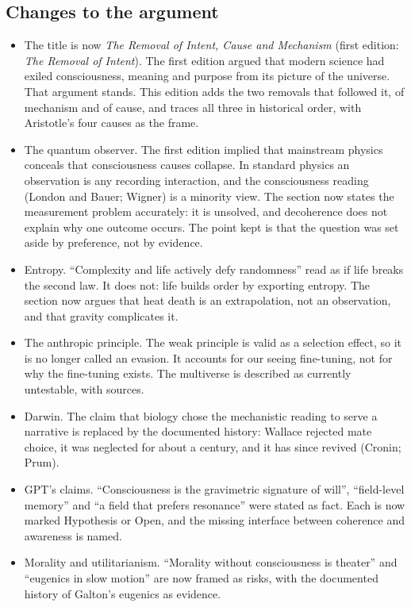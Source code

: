 \documentclass[11pt,a4paper]{article}
\begin{document}
\subsection*{Changes to the argument}
\begin{itemize}
  \item The title is now \emph{The Removal of Intent, Cause and Mechanism} (first edition: \emph{The Removal of Intent}). The first edition argued that modern science had exiled consciousness, meaning and purpose from its picture of the universe. That argument stands. This edition adds the two removals that followed it, of mechanism and of cause, and traces all three in historical order, with Aristotle's four causes as the frame.
  \item The quantum observer. The first edition implied that mainstream physics conceals that consciousness causes collapse. In standard physics an observation is any recording interaction, and the consciousness reading (London and Bauer; Wigner) is a minority view. The section now states the measurement problem accurately: it is unsolved, and decoherence does not explain why one outcome occurs. The point kept is that the question was set aside by preference, not by evidence.
  \item Entropy. ``Complexity and life actively defy randomness'' read as if life breaks the second law. It does not: life builds order by exporting entropy. The section now argues that heat death is an extrapolation, not an observation, and that gravity complicates it.
  \item The anthropic principle. The weak principle is valid as a selection effect, so it is no longer called an evasion. It accounts for our seeing fine-tuning, not for why the fine-tuning exists. The multiverse is described as currently untestable, with sources.
  \item Darwin. The claim that biology chose the mechanistic reading to serve a narrative is replaced by the documented history: Wallace rejected mate choice, it was neglected for about a century, and it has since revived (Cronin; Prum).
  \item GPT's claims. ``Consciousness is the gravimetric signature of will'', ``field-level memory'' and ``a field that prefers resonance'' were stated as fact. Each is now marked Hypothesis or Open, and the missing interface between coherence and awareness is named.
  \item Morality and utilitarianism. ``Morality without consciousness is theater'' and ``eugenics in slow motion'' are now framed as risks, with the documented history of Galton's eugenics as evidence.
\end{itemize}
\end{document}
